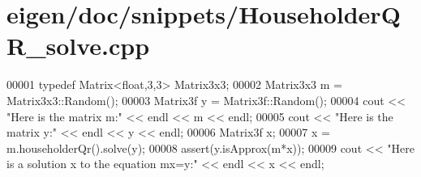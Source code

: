 \hypertarget{eigen_2doc_2snippets_2_householder_q_r__solve_8cpp_source}{}\section{eigen/doc/snippets/\+Householder\+Q\+R\+\_\+solve.cpp}
\label{eigen_2doc_2snippets_2_householder_q_r__solve_8cpp_source}

\begin{DoxyCode}
00001 \textcolor{keyword}{typedef} Matrix<float,3,3> Matrix3x3;
00002 Matrix3x3 m = Matrix3x3::Random();
00003 Matrix3f y = Matrix3f::Random();
00004 cout << \textcolor{stringliteral}{"Here is the matrix m:"} << endl << m << endl;
00005 cout << \textcolor{stringliteral}{"Here is the matrix y:"} << endl << y << endl;
00006 Matrix3f x;
00007 x = m.householderQr().solve(y);
00008 assert(y.isApprox(m*x));
00009 cout << \textcolor{stringliteral}{"Here is a solution x to the equation mx=y:"} << endl << x << endl;
\end{DoxyCode}
